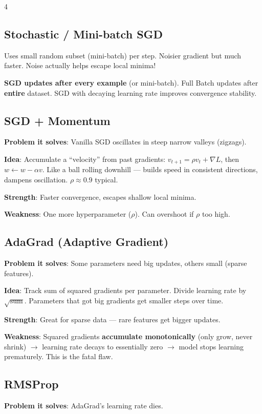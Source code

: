 \documentclass[6pt,landscape,a4paper]{extarticle}
\begin{document}
\begin{multicols}{4}
\subsection{Stochastic / Mini-batch SGD}
Uses small random subset (mini-batch) per step. Noisier gradient but much faster. Noise actually helps escape local minima!

\textbf{SGD updates after every example} (or mini-batch). Full Batch updates after \textbf{entire} dataset. SGD with decaying learning rate improves convergence stability.

\subsection{SGD + Momentum}
\textbf{Problem it solves}: Vanilla SGD oscillates in steep narrow valleys (zigzags).

\textbf{Idea}: Accumulate a ``velocity'' from past gradients: $v_{t+1} = \rho v_t + \nabla L$, then $w \leftarrow w - \alpha v$. Like a ball rolling downhill --- builds speed in consistent directions, dampens oscillation. $\rho \approx 0.9$ typical.

\textbf{Strength}: Faster convergence, escapes shallow local minima.

\textbf{Weakness}: One more hyperparameter ($\rho$). Can overshoot if $\rho$ too high.

\subsection{AdaGrad (Adaptive Gradient)}
\textbf{Problem it solves}: Some parameters need big updates, others small (sparse features).

\textbf{Idea}: Track sum of squared gradients per parameter. Divide learning rate by $\sqrt{\text{sum}}$. Parameters that got big gradients get smaller steps over time.

\textbf{Strength}: Great for sparse data --- rare features get bigger updates.

\textbf{Weakness}: Squared gradients \textbf{accumulate monotonically} (only grow, never shrink) $\to$ learning rate decays to essentially zero $\to$ model stops learning prematurely. This is the fatal flaw.

\subsection{RMSProp}
\textbf{Problem it solves}: AdaGrad's learning rate dies.


\end{multicols}
\end{document}
